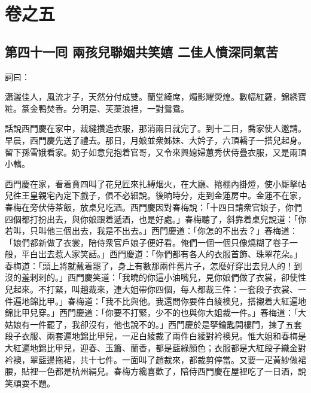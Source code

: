 \part*{{\titlename}卷之五}



\chapter*{第四十一囘 兩孩兒聯姻共笑嬉 二佳人憤深同氣苦}


詞曰：

\begin{myquote}
瀟灑佳人，風流才子，天然分付成雙。蘭堂綺席，燭影耀熒煌。數幅紅羅，錦綉寶粧。篆金鴨焚香。分明是、芙蕖浪裡，一對鴛鴦。

\end{myquote}

話說西門慶在家中，裁縫攢造衣服，那消兩日就完了。到十二日，喬家使人邀請。早晨，西門慶先送了禮去。那日，月娘並衆姊妹、大妗子，六頂轎子一搭兒起身。留下孫雪娥看家。奶子如意兒抱着官哥，又令來興媳婦蕙秀伏侍疊衣服，又是兩頂小轎。

西門慶在家，看着賁四叫了花兒匠來扎縛烟火，在大廳、捲棚內掛燈，使小厮拏帖兒徃王皇親宅內定下戲子，俱不必細說。後晌時分，走到金蓮房中。金蓮不在家，春梅在旁伏侍茶飯，放桌兒吃酒。西門慶因對春梅說：「十四日請衆官娘子，你們四個都打扮出去，與你娘跟着遞酒，也是好處。」春梅聽了，斜靠着桌兒說道：「你若叫，只叫他三個出去，我是不出去。」西門慶道：「你怎的不出去？」春梅道：「娘們都新做了衣裳，陪侍衆官戶娘子便好看。俺們一個一個只像燒糊了卷子一般，平白出去惹人家笑話。」西門慶道：「你們都有各人的衣服首飾、珠翠花朵。」春梅道：「頭上將就戴着罷了，身上有數那兩件舊片子，怎麼好穿出去見人的！到沒的羞剌剌的。」西門慶笑道：「我曉的你這小油嘴兒，見你娘們做了衣裳，卻使性兒起來。不打緊，叫趙裁來，連大姐帶你四個，每人都裁三件：一套段子衣裳、一件遍地錦比甲。」春梅道：「我不比與他。我還問你要件白綾襖兒，搭襯着大紅遍地錦比甲兒穿。」{}西門慶道：「你要不打緊，少不的也與你大姐裁一件。」春梅道：「大姑娘有一件罷了，我卻沒有，他也說不的。」西門慶於是拏鑰匙開樓門，揀了五套段子衣服、兩套遍地錦比甲兒，一疋白綾裁了兩件白綾對衿襖兒。惟大姐和春梅是大紅遍地錦比甲兒，迎春、玉簫、蘭香，都是藍綠顏色；衣服都是大紅段子織金對衿襖，翠藍邊拖裙，共十七件。一面叫了趙裁來，都裁剪停當。又要一疋黃紗做裙腰，貼裡一色都是杭州絹兒。春梅方纔喜歡了，陪侍西門慶在屋裡吃了一日酒，說笑頑耍不題。

